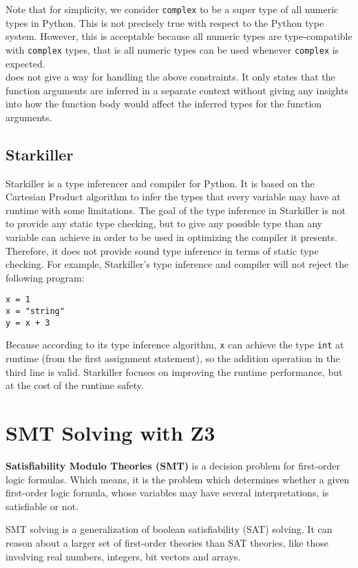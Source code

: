 Note that for simplicity, we consider \lstinline|complex| to be a super type of all numeric types in Python. This is not precisely true with respect to the Python type system. However, this is acceptable because all numeric types are type-compatible with \lstinline|complex| types, that is all numeric types can be used whenever \lstinline|complex| is expected.\\

\cite{porto} does not give a way for handling the above constraints. It only states that the function arguments are inferred in a separate context without giving any insights into how the function body would affect the inferred types for the function arguments.


\subsection{Starkiller \cite{starkiller}}
Starkiller is a type inferencer and compiler for Python. It is based on the Cartesian Product algorithm to infer the types that every variable may have at runtime with some limitations. The goal of the type inference in Starkiller is not to provide any static type checking, but to give any possible type than any variable can achieve in order to be used in optimizing the compiler it presents. Therefore, it does not provide sound type inference in terms of static type checking. For example, Starkiller's type inference and compiler will not reject the following program:
\begin{lstlisting}
x = 1
x = "string"
y = x + 3
\end{lstlisting}
Because according to its type inference algorithm, \lstinline|x| can achieve the type \lstinline|int| at runtime (from the first assignment statement), so the addition operation in the third line is valid. Starkiller focuses on improving the runtime performance, but at the cost of the runtime safety.

\section{SMT Solving with Z3 \cite{z3}}
\textbf{Satisfiability Modulo Theories (SMT)} is a decision problem for first-order logic formulas. Which means, it is the problem which determines whether a given first-order logic formula, whose variables may have several interpretations, is satisfiable or not.

SMT solving is a generalization of boolean satisfiability (SAT) solving. It can reason about a larger set of first-order theories than SAT theories, like those involving real numbers, integers, bit vectors and arrays.\\

